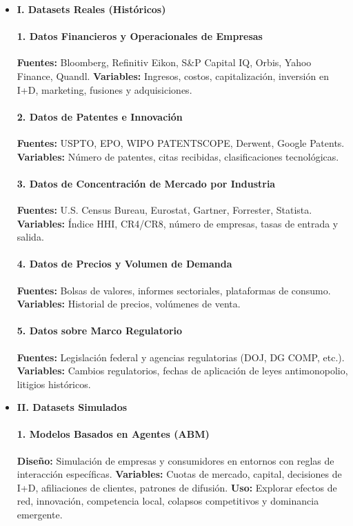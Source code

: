 \documentclass[a4paper,12pt]{article}
\begin{document}
\begin{itemize}
    \item \textbf{I. Datasets Reales (Históricos)}

    \paragraph{1. Datos Financieros y Operacionales de Empresas} 
    \textbf{Fuentes:} Bloomberg, Refinitiv Eikon, S\&P Capital IQ, Orbis, Yahoo Finance, Quandl.  
    \textbf{Variables:} Ingresos, costos, capitalización, inversión en I+D, marketing, fusiones y adquisiciones.

    \paragraph{2. Datos de Patentes e Innovación} 
    \textbf{Fuentes:} USPTO, EPO, WIPO PATENTSCOPE, Derwent, Google Patents.  
    \textbf{Variables:} Número de patentes, citas recibidas, clasificaciones tecnológicas.

    \paragraph{3. Datos de Concentración de Mercado por Industria} 
    \textbf{Fuentes:} U.S. Census Bureau, Eurostat, Gartner, Forrester, Statista.  
    \textbf{Variables:} Índice HHI, CR4/CR8, número de empresas, tasas de entrada y salida.

    \paragraph{4. Datos de Precios y Volumen de Demanda} 
    \textbf{Fuentes:} Bolsas de valores, informes sectoriales, plataformas de consumo.  
    \textbf{Variables:} Historial de precios, volúmenes de venta.

    \paragraph{5. Datos sobre Marco Regulatorio} 
    \textbf{Fuentes:} Legislación federal y agencias regulatorias (DOJ, DG COMP, etc.).  
    \textbf{Variables:} Cambios regulatorios, fechas de aplicación de leyes antimonopolio, litigios históricos.

    \item \textbf{II. Datasets Simulados}

    \paragraph{1. Modelos Basados en Agentes (ABM)} 
    \textbf{Diseño:} Simulación de empresas y consumidores en entornos con reglas de interacción específicas.  
    \textbf{Variables:} Cuotas de mercado, capital, decisiones de I+D, afiliaciones de clientes, patrones de difusión.  
    \textbf{Uso:} Explorar efectos de red, innovación, competencia local, colapsos competitivos y dominancia emergente.


\end{itemize}
\end{document}
